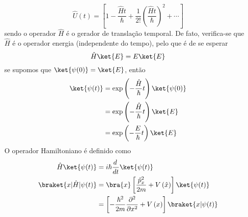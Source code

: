 \documentclass[12pt,brazil,table]{beamer}
\begin{document}
\begin{frame}
\begin{columns}[T]
  
  \vspace*{-0.8cm}
  \[
      \hat{U}(t) = \left[ 1 - \dfrac{\hat{H}t}{\hbar} + \dfrac{1}{2!}\left( \dfrac{\hat{H}t}{\hbar} \right)^2 + \cdots \right]
  \]
  sendo o operador $\hat{H}$ é o gerador de translação temporal. De fato, verifica-se que $\hat{H}$ é o operador energia (independente do tempo), pelo que é de se esperar\vspace*{-0.15cm}
  \[
    \hat{H}\ket{E} = E\ket{E}\vspace*{-0.15cm}
  \]
  se supomos que $\ket{\psi (0)}=\ket{E}$, então\vspace*{-0.25cm}
  \[
    \begin{align*}
   \ket{\psi(t)} &= \exp\left( -\dfrac{\hat{H}}{\hbar}t \right)\ket{\psi (0)}\\
    &= \exp\left( -\dfrac{\hat{H}}{\hbar}t \right)\ket{E}\\
    &= \exp\left( -\dfrac{E}{\hbar}t \right)\ket{E}
    \end{align*}\vspace*{-0.25cm}
  \]
  O operador Hamiltoniano é definido como\vspace*{-0.3cm}
  \[
    \begin{align*}
    \hat{H}\ket{\psi(t)} &= i\hbar \dfrac{d\,}{dt}\ket{\psi(t)}\\
    \braket{x|\hat{H}|\psi(t)} &= \bra{x}\left[\dfrac{\hat{p}_x^2}{2m} + V\left(\hat{x}\right) \right]\ket{\psi(t)}\\
    &= \left[-\dfrac{\hbar^2}{2m}\dfrac{\partial^2 }{\partial  x^2} + V\left(x\right)\right]\braket{x|\psi(t)}
    \end{align*}
  \]
  
  \end{columns}

\end{frame}
  

\end{document}

